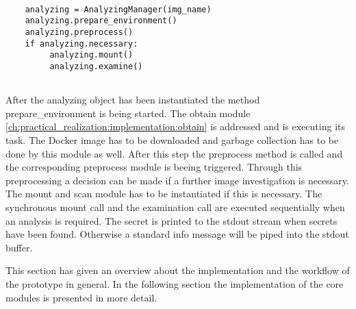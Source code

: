 \lstset{language=Python} 
\begin{lstlisting}[]
	
    analyzing = AnalyzingManager(img_name)
    analyzing.prepare_environment()
    analyzing.preprocess()
    if analyzing.necessary:
         analyzing.mount()
         analyzing.examine()
    
\end{lstlisting}
After the analyzing object has been instantiated the method prepare\_environment is being started. 
The obtain module \ref{ch:practical_realization:implementation:obtain} is addressed and is executing its task.
The Docker image has to be downloaded and garbage collection has to be done by this module as well. 
After this step the preprocess method is called and the corresponding preprocess module is beeing triggered.
Through this preprocessing a decision can be made if a further image investigation is necessary. 
The mount and scan module has to be instantiated if this is necessary.
The synchronous mount call and the examination call are executed sequentially when an analysis is required.
The secret is printed to the stdout stream when secrets have been found. 
Otherwise a standard info message will be piped into the stdout buffer.

This section has given an overview about the implementation and the workflow of the prototype in general.
In the following section the implementation of the core modules is presented in more detail.


